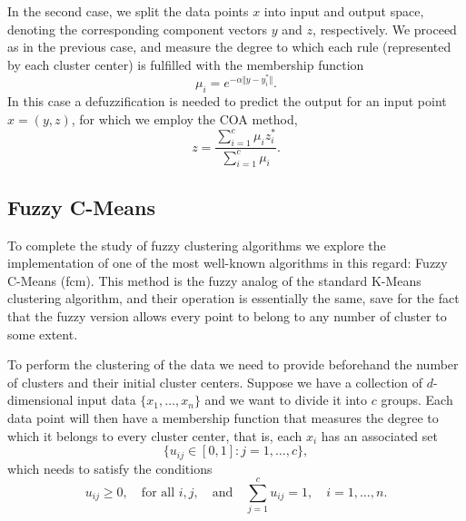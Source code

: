 In the second case, we split the data points $x$ into input and output space, denoting the corresponding component vectors $y$ and $z$, respectively. We proceed as in the previous case, and measure the degree to which each rule (represented by each cluster center) is fulfilled with the membership function
\[
\mu_i = e^{-\alpha \Vert y - y_i^\ast \Vert}.
\]
In this case a defuzzification is needed to predict the output for an input point $x=(y,z)$, for which we employ the COA method,
\[
z = \dfrac{\displaystyle \sum_{i=1}^c \mu_iz_i^\ast}{\displaystyle \sum_{i=1}^c \mu_i}.
\]

\subsection{Fuzzy C-Means}

To complete the study of fuzzy clustering algorithms we explore the implementation of one of the most well-known algorithms in this regard: Fuzzy C-Means (\acrshort{fcm}). This method is the fuzzy analog of the standard K-Means clustering algorithm, and their operation is essentially the same, save for the fact that the fuzzy version allows every point to belong to any number of cluster to some extent.

To perform the clustering of the data we need to provide beforehand the number of clusters and their initial cluster centers. Suppose we have a collection of $d$-dimensional input data $\{x_1,\dots,x_n\}$ and we want to divide it into $c$ groups. Each data point will then have a membership function that measures the degree to which it belongs to every cluster center, that is, each $x_i$ has an associated set
\[
\{u_{ij} \in [0,1]: j=1,\dots,c \},
\]
which needs to satisfy the conditions
\begin{equation} \label{eq:fcm-constraint}
u_{ij}\geq 0, \quad \text{for all } i,j, \quad \text{and} \quad \sum_{j=1}^c u_{ij} = 1, \quad i=1,\dots,n.
\end{equation}

